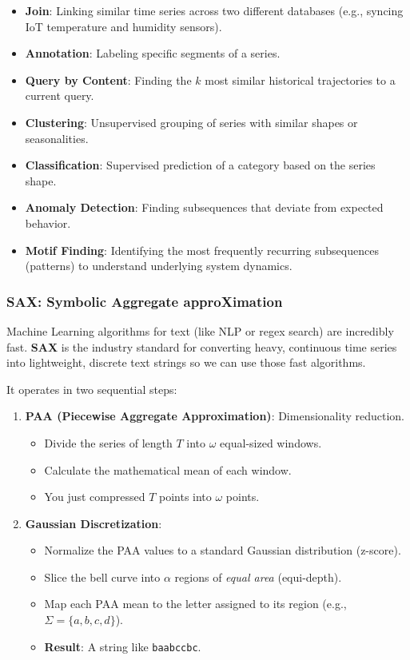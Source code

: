 \documentclass[11pt]{article}
\theoremstyle{smallexample}
\begin{document}
\begin{itemize}
    \item \textbf{Join}: Linking similar time series across two different databases (e.g., syncing IoT temperature and humidity sensors).
    \item \textbf{Annotation}: Labeling specific segments of a series.
    \item \textbf{Query by Content}: Finding the $k$ most similar historical trajectories to a current query.
    \item \textbf{Clustering}: Unsupervised grouping of series with similar shapes or seasonalities.
    \item \textbf{Classification}: Supervised prediction of a category based on the series shape.
    \item \textbf{Anomaly Detection}: Finding subsequences that deviate from expected behavior. 
    \item \textbf{Motif Finding}: Identifying the most frequently recurring subsequences (patterns) to understand underlying system dynamics.
\end{itemize}

\subsubsection{SAX: Symbolic Aggregate approXimation}

Machine Learning algorithms for text (like NLP or regex search) are incredibly fast. \textbf{SAX} is the industry standard for converting heavy, continuous time series into lightweight, discrete text strings so we can use those fast algorithms.

It operates in two sequential steps:

\begin{enumerate}
    \item \textbf{PAA (Piecewise Aggregate Approximation)}: Dimensionality reduction. 
    \begin{itemize}
        \item Divide the series of length $T$ into $\omega$ equal-sized windows.
        \item Calculate the mathematical mean of each window. 
        \item You just compressed $T$ points into $\omega$ points.
    \end{itemize}
    \item \textbf{Gaussian Discretization}: 
    \begin{itemize}
        \item Normalize the PAA values to a standard Gaussian distribution (z-score).
        \item Slice the bell curve into $\alpha$ regions of \textit{equal area} (equi-depth).
        \item Map each PAA mean to the letter assigned to its region (e.g., $\Sigma = \{a, b, c, d\}$).
        \item \textbf{Result}: A string like \texttt{baabccbc}.
    \end{itemize}
\end{enumerate}
\end{document}
